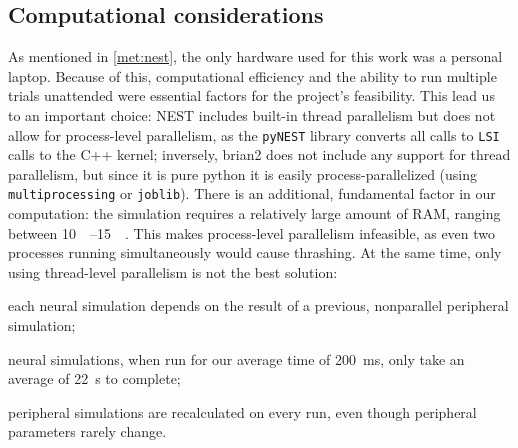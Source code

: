 \documentclass[11pt,a4paper]{article}
\begin{document}
\subsection{Computational considerations}
As mentioned in \ref{met:nest}, the only hardware used for this work was a personal laptop. Because of this, computational efficiency and the ability to run multiple trials unattended were essential factors for the project's feasibility. This lead us to an important choice: NEST includes built-in thread parallelism but does not allow for process-level parallelism, as the \lstinline{pyNEST} library converts all calls to \lstinline{LSI} calls to the C++ kernel; inversely, brian2 does not include any support for thread parallelism, but since it is pure python it is easily process-parallelized (using \lstinline{multiprocessing} or \lstinline{joblib}). There is an additional, fundamental factor in our computation: the simulation requires a relatively large amount of RAM, ranging between \qtyrange{10}{15}{\giga\byte}. This makes process-level parallelism infeasible, as even two processes running simultaneously would cause thrashing. At the same time, only using thread-level parallelism is not the best solution: 
\begin{inlinelist}
    \item each neural simulation depends on the result of a previous, nonparallel peripheral simulation;
    \item neural simulations, when run for our average time of \qty{200}{\milli\second}, only take an average of \qty{22}{\second} to complete;
    \item peripheral simulations are recalculated on every run, even though peripheral parameters rarely change.
\end{inlinelist}
\end{document}
